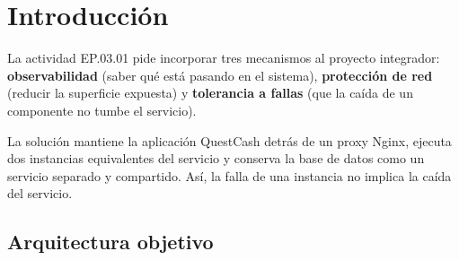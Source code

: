 \documentclass[11pt,letterpaper]{article}
\begin{document}
\section{Introducción}

La actividad EP.03.01 pide incorporar tres mecanismos al proyecto integrador:
\textbf{observabilidad} (saber qué está pasando en el sistema),
\textbf{protección de red} (reducir la superficie expuesta) y
\textbf{tolerancia a fallas} (que la caída de un componente no tumbe el
servicio).

La solución mantiene la aplicación QuestCash detrás de un proxy Nginx, ejecuta
dos instancias equivalentes del servicio y conserva la base de datos como un
servicio separado y compartido. Así, la falla de una instancia no implica la
caída del servicio.

\subsection{Arquitectura objetivo}
\end{document}
